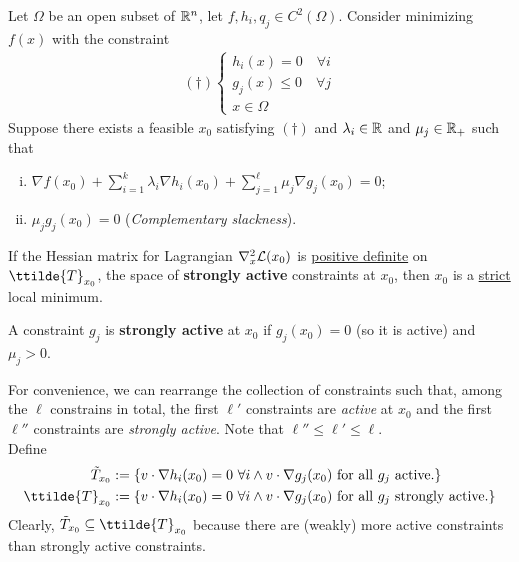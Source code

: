 \documentclass{article}
\begin{document}
	\begin{theorem}
		Let $\Omega$ be an open subset of $\mathbb{R}^n$, let $f, h_i, q_j \in C^2(\Omega)$. Consider minimizing $f(x)$ with the constraint
		\begin{align}
			(\dag ) \begin{cases}
				h_i(x) = 0\quad \forall i \\
				g_j(x) \leq 0\quad \forall j \\
				x \in \Omega
			\end{cases}
		\end{align}
		Suppose there exists a feasible $x_0$ satisfying $(\dag)$ and $\lambda_i \in \mathbb{R}$ and $\mu_j \in \mathbb{R}_{+}$ such that
   		\begin{enumerate}[(i)]
   			\item $\nabla f(x_0) + \sum_{i=1}^k \lambda_i \nabla h_i(x_0) + \sum_{j=1}^\ell \mu_j \nabla g_j(x_0) = 0$;
   			\item $\mu_j g_j(x_0) = 0$ (\emph{Complementary slackness}).
   		\end{enumerate}
   		If the Hessian matrix for Lagrangian $\nabla_x^2 \mathcal{{L}}(x_0)$ is \ul{positive definite} on $\ttilde{T}_{x_0}$, the space of \textbf{strongly active} constraints at $x_0$, then $x_0$ is a \ul{strict} local minimum.
	\end{theorem}
	
	\begin{definition}
		A constraint $g_j$ is \textbf{strongly active} at $x_0$ if $g_j(x_0) = 0$ (so it is active) and $\mu_j > 0$. 
	\end{definition}
	
	\begin{notation}
		For convenience, we can rearrange the collection of constraints such that, among the $\ell$ constrains in total, the first $\ell'$ constraints are \emph{active} at $x_0$ and the first $\ell''$ constraints are \emph{strongly active}. Note that $\ell'' \leq \ell ' \leq \ell$. \\
		Define 
		\begin{align}
			\tilde{T}_{x_0} &:= \{
			v \cdot \nabla h_i(x_0) = 0\ \forall i \land v \cdot \nabla g_j(x_0)\tx{ for all $g_j$ active.}
			\} \\
			\ttilde{T}_{x_0} &:= \{
			v \cdot \nabla h_i(x_0) = 0\ \forall i \land v \cdot \nabla g_j(x_0) \tx{ for all $g_j$ strongly active.}
			\}
		\end{align}
		Clearly, $\tilde{T}_{x_0} \subseteq \ttilde{T}_{x_0}$ because there are (weakly) more active constraints than strongly active constraints.
	\end{notation}
	
\end{document}
